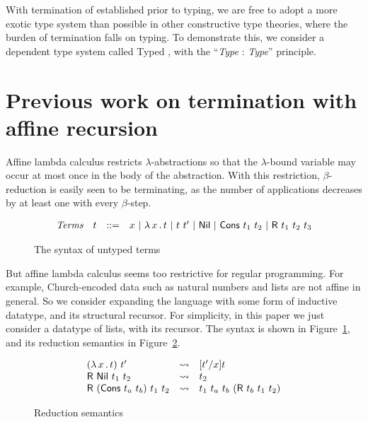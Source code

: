 \documentclass{article}
\begin{document}
With termination of \sar established prior to typing, we are free to
adopt a more exotic type system than possible in other constructive
type theories, where the burden of termination falls on typing.  To
demonstrate this, we consider a dependent type system called Typed
\sar, with the ``\textit{Type} : \textit{Type}'' principle.

\section{Previous work on termination with affine recursion}
\label{sec:prevaff}

Affine lambda calculus restricts $\lambda$-abstractions so that the
$\lambda$-bound variable may occur at most once in the body of the
abstraction.  With this restriction, $\beta$-reduction is easily seen
to be terminating, as the number of applications decreases by at least
one with every $\beta$-step.

\begin{figure}
  \[
  \begin{array}{llll}
    \textit{Terms} & t & ::= & x\ |\ \lam{x}{t}\ |\ t\ t'\ |\ \mathsf{Nil}\ |\ \mathsf{Cons}\ t_1\ t_2\ |\ \mathsf{R}\ t_1\ t_2\ t_3
  \end{array}
  \]
  \caption{The syntax of untyped terms}
\label{fig:syn}
\end{figure}

But affine lambda calculus seems too restrictive for regular
programming.  For example, Church-encoded data such as natural numbers
and lists are not affine in general.  So we consider expanding the
language with some form of inductive datatype, and its structural
recursor.  For simplicity, in this paper we just consider a datatype of lists, with its
recursor.  The syntax is shown in Figure~\ref{fig:syn}, and its reduction semantics in Figure~\ref{fig:redsem}.

\begin{figure}
  \[
  \begin{array}{lll}
    (\lambda\, x\, .\, t)\ t' & \leadsto & [t'/x]t \\
    \mathsf{R}\ \mathsf{Nil}\ t_1\ t_2 & \leadsto & t_2 \\
    \mathsf{R}\ (\mathsf{Cons}\ t_a\ t_b)\ t_1\ t_2 & \leadsto & t_1\ t_a\ t_b\ (\mathsf{R}\ t_b\ t_1\ t_2)
  \end{array}
  \]
  \caption{Reduction semantics}
\label{fig:redsem}
\end{figure}
\end{document}

